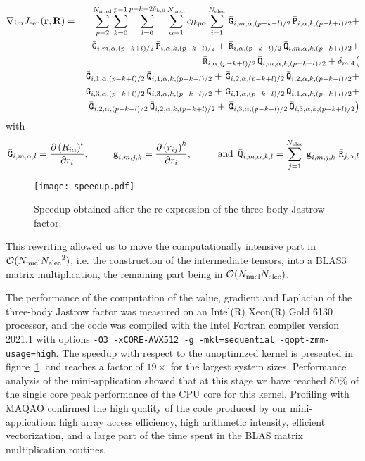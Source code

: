\begin{eqnarray*}
  \nabla_{im} J_{\text{een}}(\mathbf{r},\mathbf{R}) & = &
  \sum_{p=2}^{N_{\text{nord}}}\sum_{k=0}^{p-1}
  \sum_{l=0}^{p-k-2\delta_{k,0}} 
    \sum_{\alpha=1}^{N_{\text{nucl}}}
    c_{lkp\alpha}
    \sum_{i=1}^{N_{\text{elec}}} 
     {\, \bar{\mathtt{G}}}_{i,m,\alpha,(p-k-l)/2} {\, \bar{\mathtt{P}}}_{i,\alpha,k,(p-k+l)/2} +  \\
&&   {\, \bar{\mathtt{G}}}_{i,m,\alpha,(p-k+l)/2} {\, \bar{\mathtt{P}}}_{i,\alpha,k,(p-k-l)/2} + 
     {\, \bar{\mathtt{R}}}_{i,\alpha,(p-k-l)/2} {\, \bar{\mathtt{Q}}}_{i,m,\alpha,k,(p-k+l)/2} + \\
&&   {\, \bar{\mathtt{R}}}_{i,\alpha,(p-k+l)/2} {\, \bar{\mathtt{Q}}}_{i,m,\alpha,k,(p-k-l)/2} + 
    \delta_{m,4} \big( \\
&&     {\, \bar{\mathtt{G}}}_{i,1,\alpha,(p-k+l)/2} {\, \bar{\mathtt{Q}}}_{i,1,\alpha,k,(p-k-l)/2} +
       {\, \bar{\mathtt{G}}}_{i,2,\alpha,(p-k+l)/2} {\, \bar{\mathtt{Q}}}_{i,2,\alpha,k,(p-k-l)/2} + \\
&&     {\, \bar{\mathtt{G}}}_{i,3,\alpha,(p-k+l)/2} {\, \bar{\mathtt{Q}}}_{i,3,\alpha,k,(p-k-l)/2} +
       {\, \bar{\mathtt{G}}}_{i,1,\alpha,(p-k-l)/2} {\, \bar{\mathtt{Q}}}_{i,1,\alpha,k,(p-k+l)/2} + \\
&&     {\, \bar{\mathtt{G}}}_{i,2,\alpha,(p-k-l)/2} {\, \bar{\mathtt{Q}}}_{i,2,\alpha,k,(p-k+l)/2} + 
       {\, \bar{\mathtt{G}}}_{i,3,\alpha,(p-k-l)/2} {\, \bar{\mathtt{Q}}}_{i,3,\alpha,k,(p-k+l)/2} \big)
\end{eqnarray*}
with 
\[
  {\, \bar{\mathtt{G}}}_{i, m, \alpha, l}  =  \frac{\partial \left( {R}_{i\alpha} \right)^l}
                             {\partial r_i},  \phantom{ space }
  {\, \bar{\mathtt{g}}}_{i, m, j, k}  =  \frac{\partial \left( {r}_{ij} \right)^k}
                             {\partial r_i}, \phantom{ space }
                             \text{ and } 
  {\, \bar{\mathtt{Q}}}_{i, m, \alpha, k, l}  =  \sum_{j=1}^{N_{\text{elec}}}
                            {\, \bar{\mathtt{g}}}_{i,m,j,k}\,{\, \bar{\mathtt{R}}}_{j,\alpha,l} 
\]
  
\begin{figure}[t]
  \begin{center}
  \texttt{[image: speedup.pdf]}
  \end{center}
  \caption{\label{fig:speedup}Speedup obtained after the re-expression of the three-body
    Jastrow factor.}
\end{figure}

This rewriting allowed us to move the computationally intensive part in
$\mathcal{O}(N_{\text{nucl}}{N_{\text{elec}}}^2)$, i.e. the construction of the intermediate
tensors, into a BLAS3 matrix multiplication, the remaining part being
in $\mathcal{O}(N_{\text{nucl}} N_{\text{elec}})$.

The performance of the computation of the value, gradient and Laplacian of
the three-body Jastrow factor was measured on an Intel(R) Xeon(R) Gold
6130 processor, and the code was compiled with the Intel Fortran
compiler version 2021.1 with options
\texttt{-O3 -xCORE-AVX512 -g -mkl=sequential -qopt-zmm-usage=high}.
The speedup with respect to the unoptimized kernel is presented in
figure~\ref{fig:speedup}, and reaches a factor of $19\times$ for the
largest system sizes. Performance analyzis of the mini-application
showed that at this stage we have reached 80\% of the single core peak
performance of the CPU core for this kernel. Profiling with MAQAO
confirmed the high quality of the code produced by our mini-application:
high array access efficiency, high arithmetic intensity, efficient
vectorization, and a large part of the time spent in the BLAS matrix
multiplication routines.

